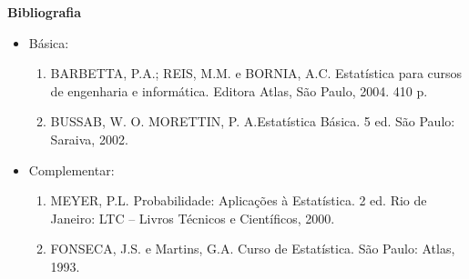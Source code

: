 
\begin{snugshade}\begin{center}\textbf{
    Bibliografia
}\end{center}\end{snugshade}

\begin{itemize} 
  \item Básica:
	\begin{enumerate}
	\item BARBETTA, P.A.; REIS, M.M. e BORNIA, A.C. Estatística para cursos de engenharia e informática. Editora Atlas, São Paulo, 2004. 410 p.
	\item BUSSAB, W. O. MORETTIN, P. A.Estatística Básica.  5 ed.  São Paulo: Saraiva, 2002.
	\end{enumerate}
  \item Complementar:
	\begin{enumerate} 
	\item MEYER, P.L. Probabilidade: Aplicações à Estatística. 2 ed.  Rio de Janeiro: LTC – Livros Técnicos e Científicos, 2000.
	\item FONSECA, J.S. e Martins, G.A. Curso de Estatística. São Paulo: Atlas, 1993.
	\end{enumerate}
\end{itemize}

